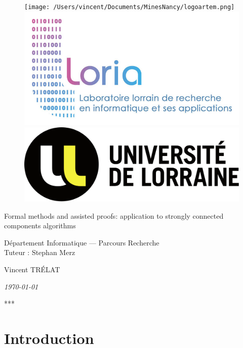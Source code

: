 \documentclass[a4 paper, 12pt]{article}
\begin{document}
\begin{titlepage}
    \begin{figure}[!h]
        \centering
        \texttt{[image: /Users/vincent/Documents/MinesNancy/logoartem.png]}
        \hspace{1cm}
        \includegraphics[height = .1\textwidth]{img/logoloria.jpg}
        \hspace{1cm}
        \includegraphics[height = .1\textwidth]{img/logoUL.png}
    \end{figure}
    \vspace{3cm}

    \begin{center}
        \huge{Formal methods and assisted proofs: application to strongly connected components algorithms}
    \end{center}
    \vspace{1cm}
    \begin{center}
        \large{Département Informatique --- Parcours Recherche \\ Tuteur : Stephan Merz}
    \end{center}
    \vspace{1 cm}
    \begin{center}
        Vincent TRÉLAT
    \end{center}
    \vspace{2 cm}
    \begin{center}
        \textit{\today}
    \end{center}
    \vspace{2 cm}
    \begin{center}
        ***
    \end{center}
    
\end{titlepage}
\restoregeometry
\tableofcontents
\pagebreak

\section{Introduction}
\end{document}
